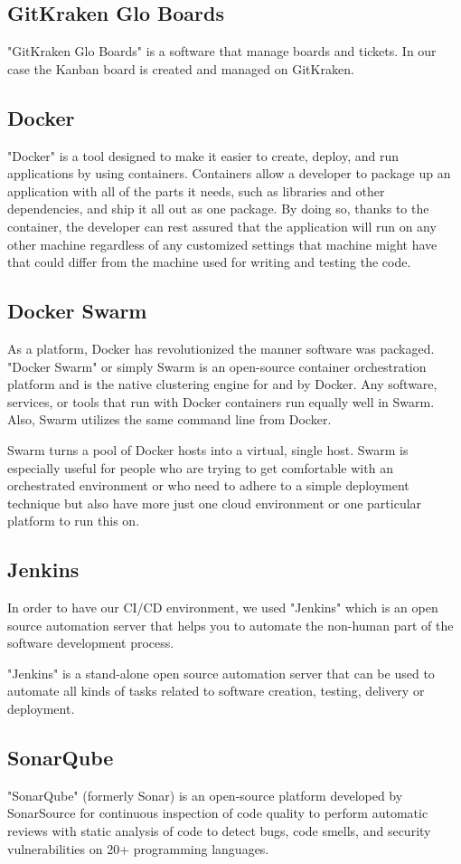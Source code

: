 \begin{spacing}{1.2}
\subsection{GitKraken Glo Boards}
"GitKraken Glo Boards" is a software that manage boards and tickets. In our case the Kanban board is created and managed on GitKraken.
\subsection{Docker}
"Docker"\cite{Docker} is a tool designed to make it easier to create, deploy, and run applications by using containers. Containers allow a developer to package up an application with all of the parts it needs, such as libraries and other dependencies, and ship it all out as one package. By doing so, thanks to the container, the developer can rest assured that the application will run on any other machine regardless of any customized settings that machine might have that could differ from the machine used for writing and testing the code.
\subsection{Docker Swarm}
As a platform, Docker has revolutionized the manner software was packaged. "Docker Swarm" \cite{Dockerswarm} or simply Swarm is an open-source container orchestration platform and is the native clustering engine for and by Docker. Any software, services, or tools that run with Docker containers run equally well in Swarm. Also, Swarm utilizes the same command line from Docker.

Swarm turns a pool of Docker hosts into a virtual, single host. Swarm is especially useful for people who are trying to get comfortable with an orchestrated environment or who need to adhere to a simple deployment technique but also have more just one cloud environment or one particular platform to run this on.
\subsection{Jenkins}
In order to have our CI/CD environment, we used "Jenkins" \cite{Jenkins} which is an open source automation server that helps you to automate the non-human part of the software development process.

"Jenkins" is a stand-alone open source automation server that can be used to automate all kinds of tasks related to software creation, testing, delivery or deployment.
\subsection{SonarQube}
"SonarQube"\cite{SonarQube} (formerly Sonar) is an open-source platform developed by SonarSource for continuous inspection of code quality to perform automatic reviews with static analysis of code to detect bugs, code smells, and security vulnerabilities on 20+ programming languages.


\end{spacing}
